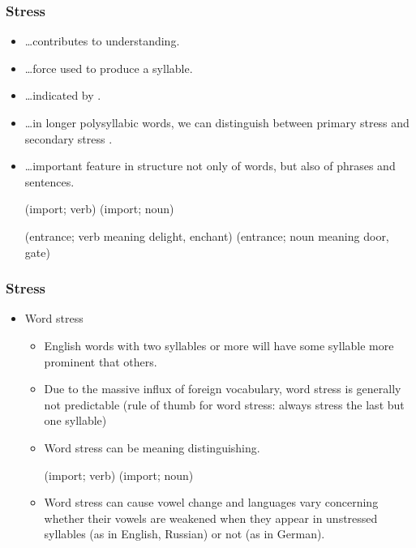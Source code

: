 \documentclass[12pt, table]{beamer}
\newcommand{\myipa}[1]{{\shorthandoff{"}\scantokens{\tipaencoding#1\endinput}}}
\begin{document}
\begin{frame}
\frametitle{Stress}
\begin{itemize}
\item \dots contributes to understanding.
\item \dots force used to produce a syllable.	
\item \dots indicated by .
\item \dots in longer polysyllabic words, we can distinguish between primary stress  and secondary stress \myipa{""cvcv"cvcv}.
\item \dots important feature in structure not only of words, but also of phrases and sentences.
\footnotesize{
\begin{exe}
\ex \begin{xlist}
\ex \textipa{[im"p6^{r}t]} (import; verb) 
\ex \myipa{["imp6^{r}t]} (import; noun)
\end{xlist}
\end{exe}
\begin{exe}
\ex \begin{xlist}
\ex \textipa{[en"trA:ns]} (entrance; verb meaning delight, enchant)
\ex \myipa{["entr@ns]} (entrance; noun meaning door, gate)
\end{xlist}
\end{exe}}
\end{itemize}
\end{frame}

\begin{frame}
\frametitle{Stress}
\begin{itemize}
\item Word stress
\begin{itemize}
\item English words with two syllables or more will have some syllable more prominent that others.
\item Due to the massive influx of foreign vocabulary, word stress is generally not predictable (rule of thumb for word stress: always stress the last but one syllable)
\item Word stress can be meaning distinguishing.
\footnotesize{
\begin{exe}
\ex \begin{xlist}
\ex \textipa{[im"p6^{r}t]} (import; verb) 
\ex \myipa{["imp6^{r}t]} (import; noun)
\end{xlist}
\end{exe}}
\item Word stress can cause vowel change and languages vary concerning whether their vowels are weakened when they appear in unstressed syllables (as in English, Russian) or not (as in German).
\end{itemize}
\end{itemize}
\end{frame}
\end{document}
